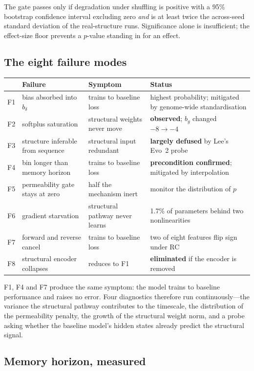 \documentclass[11pt,a4paper]{article}
\begin{document}
The gate passes only if degradation under shuffling is positive with a 95\%
bootstrap confidence interval excluding zero \emph{and} is at least twice the
across-seed standard deviation of the real-structure runs. Significance alone is
insufficient; the effect-size floor prevents a $p$-value standing in for an
effect.

\subsection{The eight failure modes}

\begin{longtable}{@{}clp{4.4cm}p{4.6cm}@{}}
\toprule
& Failure & Symptom & Status \\
\midrule
\endhead
F1 & bias absorbed into $b_\delta$ & trains to baseline loss & highest probability; mitigated by genome-wide standardisation \\
F2 & softplus saturation & structural weights never move & \textbf{observed}; $b_g$ changed $-8 \to -4$ \\
F3 & structure inferable from sequence & structural input redundant & \textbf{largely defused} by Lee's Evo~2 probe \\
F4 & bin longer than memory horizon & trains to baseline loss & \textbf{precondition confirmed}; mitigated by interpolation \\
F5 & permeability gate stays at zero & half the mechanism inert & monitor the distribution of $p$ \\
F6 & gradient starvation & structural pathway never learns & 1.7\% of parameters behind two nonlinearities \\
F7 & forward and reverse cancel & trains to baseline loss & two of eight features flip sign under RC \\
F8 & structural encoder collapses & reduces to F1 & \textbf{eliminated} if the encoder is removed \\
\bottomrule
\end{longtable}

F1, F4 and F7 produce the same symptom: the model trains to baseline performance
and raises no error. Four diagnostics therefore run continuously---the variance
the structural pathway contributes to the timescale, the distribution of the
permeability penalty, the growth of the structural weight norm, and a probe
asking whether the baseline model's hidden states already predict the structural
signal.

\subsection{Memory horizon, measured}
\end{document}
